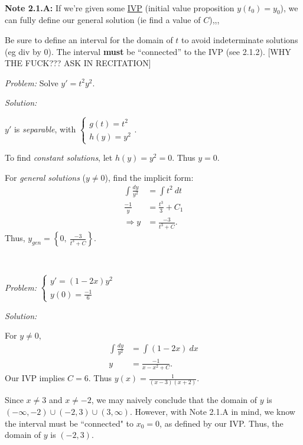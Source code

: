 \documentclass{article}
\begin{document}
\

\textbf{Note 2.1.A:} If we're given some \underline{IVP} (initial value proposition $y( t_{0}) =y_{0}$), we can fully define our general solution (ie find a value of $C$),,,

Be sure to define an interval for the domain of $t$ to avoid indeterminate solutions (eg div by 0). The interval \textbf{must} be ``connected'' to the IVP (see 2.1.2). [WHY THE FUCK??? ASK IN RECITATION]

\begin{example}

\textit{Problem:} Solve $y'=t^{2} y^{2}$. 

\textit{Solution:}

$y'$ is \textit{separable}, with $\begin{cases}
g( t) =t^{2}\\
h( y) =y^{2}
\end{cases}$.



To find \textit{constant solutions}, let $h( y) =y^{2} =0$. Thus $y=0$.



For \textit{general solutions} ($y\neq 0$), find the implicit form:
\begin{align*}
\int \frac{dy}{y^{2}} & =\int t^{2} \ dt\\
\frac{-1}{y} & =\frac{t^{3}}{3} +C_{1}\\
\Longrightarrow y & =\frac{-3}{t^{3} +C} .
\end{align*}
Thus, $y_{gen} =\left\{0,\ \frac{-3}{t^{3} +C}\right\}$.

\end{example}
\

\begin{example}

\textit{Problem:} 
$\begin{cases}
y'=( 1-2x) y^{2}\\
y( 0) =\tfrac{-1}{6}
\end{cases}$

\textit{Solution:}

For $y\neq 0$,
\begin{align*}
\int \tfrac{dy}{y^{2}} & =\int ( 1-2x) \ dx\\
y & =\frac{-1}{x-x^{2} +C} .
\end{align*}
Our IVP implies $C=6$. Thus $y( x) =\frac{1}{( x-3)( x+2)}$.



Since $x\neq 3$ and $x\neq -2$, we may naively conclude that the domain of $y$ is $( -\infty ,-2) \cup ( -2,3) \cup ( 3,\infty )$. However, with Note 2.1.A in mind, we know the interval must be ``connected" to $x_{0} =0$, as defined by our IVP. Thus, the domain of $y$ is $( -2,3)$.
\end{example}











\end{document}
